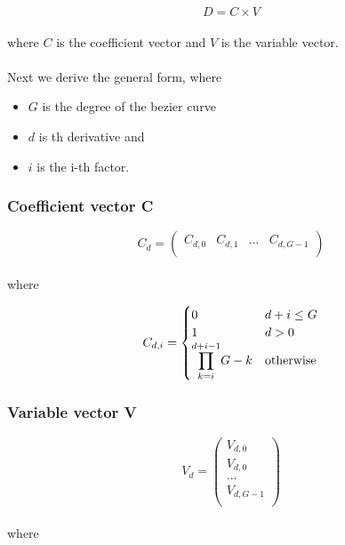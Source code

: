 \begin{equation*}
    D=C \times V
\end{equation*}
\\
where $C$ is the coefficient vector and $V$ is the variable vector.\\
\\
Next we derive the general form, where

\begin{itemize}
    \item $G$ is the degree of the bezier curve
    \item $d$ is th derivative and
    \item $i$ is the i-th factor.
\end{itemize}

\subsubsection{Coefficient vector C}

\begin{equation*}
    C_{d}=
    \left(
    \begin{array}{cccc}
            C_{d,0} & C_{d,1} & ... & C_{d,G - 1} \\
        \end{array}
    \right)
\end{equation*}
\\
where

\begin{equation*}
    C_{d,i}=
    \begin{cases}
        0                                            & d + i \leq G     \\
        1                                            & d>0              \\
        \mathlarger{\prod}_{k = i}^{d + i - 1} G - k & \text{otherwise}
    \end{cases}
\end{equation*}

\subsubsection{Variable vector V}

\begin{equation*}
    V_{d}=
    \left(
    \begin{array}{cccc}
            V_{d,0}   \\
            V_{d,0}   \\
            ...       \\
            V_{d,G-1} \\
        \end{array}
    \right)
\end{equation*}
\\
where

